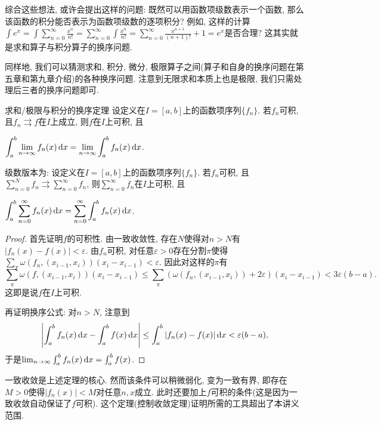 综合这些想法, 或许会提出这样的问题: 既然可以用函数项级数表示一个函数, 那么该函数的积分能否表示为函数项级数的逐项积分? 例如, 这样的计算$\displaystyle \int e^x = \int \sum_{n=0}^{\infty} \frac{x^n}{n!} = \sum_{n=0}^{\infty} \int \frac{x^n}{n!} = \sum_{n=0}^{\infty} \frac{x^{n+1}}{(n+1)!} +1 = e^x$是否合理? 这其实就是求和算子与积分算子的换序问题. 

同样地, 我们可以猜测求和, 积分, 微分, 极限算子之间(算子和自身的换序问题在第五章和第九章介绍)的各种换序问题. 注意到无限求和本质上也是极限, 我们只需处理后三者的换序问题即可. 

\begin{theorem}{求和/极限与积分的换序定理}
	设定义在$I=[a,b]$上的函数项序列$\{ f_n \}$. 若$f_n$可积, 且$f_n \rightrightarrows f$在$I$上成立, 则$f$在$I$上可积, 且
	\begin{center}
		$\displaystyle \int_a^b \lim_{n\to \infty} f_n(x) \mathop{}\!\mathrm{d} x = \lim_{n \to \infty} \int_a^b f_n(x) \mathop{}\!\mathrm{d} x$. 
	\end{center}
\end{theorem}
\begin{remark}
	级数版本为: 设定义在$I=[a,b]$上的函数项序列$\{ f_n \}$. 若$f_n$可积, 且$\sum_{n=0}^{N}f_n \rightrightarrows \sum_{n=0}^{\infty} f_n$, 则$\sum_{n=0}^{\infty} f_n$在$I$上可积, 且
	\begin{center}
		$\displaystyle \int_a^b \sum_{n=0}^{\infty} f_n(x) \mathop{}\!\mathrm{d} x = \sum_{n=0}^{\infty} \int_a^b f_n(x) \mathop{}\!\mathrm{d} x$. 
	\end{center}
\end{remark}
\begin{proof}
	首先证明$f$的可积性. 由一致收敛性, 存在$N$使得对$n>N$有$|f_n(x)-f(x)|<\varepsilon$. 由$f_n$可积, 对任意$\varepsilon >0$存在分割$\pi$使得$\sum_{\pi} \omega(f_n,(x_{i-1},x_i))(x_i-x_{i-1}) < \varepsilon$. 因此对这样的$\pi$有$$\sum_{\pi} \omega(f,(x_{i-1},x_i))(x_i-x_{i-1}) \leq \sum_{\pi} (\omega(f_n,(x_{i-1},x_i))+2\varepsilon)(x_i-x_{i-1}) < 3\varepsilon(b-a).$$
	这即是说$f$在$I$上可积. 
	
	再证明换序公式: 对$n>N$, 注意到$$\left| \int_a^b f_n(x) \mathop{}\!\mathrm{d} x - \int_a^b f(x) \mathop{}\!\mathrm{d} x \right| \leq \int_a^b \left| f_n(x)-f(x) \right| \mathop{}\!\mathrm{d} x < \varepsilon (b-a),$$
	于是$\lim_{n\to \infty} \int_a^b f_n(x) \mathop{}\!\mathrm{d} x = \int_a^b f(x)$. 
\end{proof}

一致收敛是上述定理的核心. 然而该条件可以稍微弱化, 变为一致有界, 即存在$M>0$使得$|f_n(x)|<M$对任意$n,x$成立. 此时还要加上$f$可积的条件(这是因为一致收敛自动保证了$f$可积). 这个定理(控制收敛定理)证明所需的工具超出了本讲义范围. 

